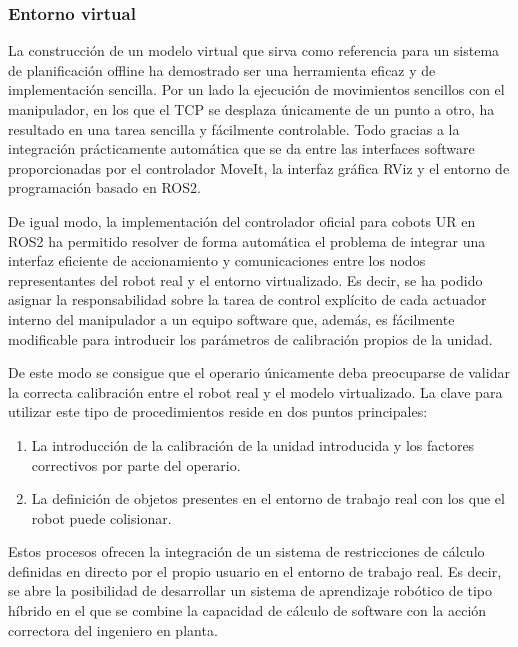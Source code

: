 \subsubsection*{Entorno virtual}
\hypertarget{Entorno virtual}{}

La construcción de un modelo virtual que sirva como referencia para un sistema de planificación offline ha demostrado ser una herramienta eficaz y de implementación sencilla. Por un lado la ejecución de movimientos sencillos con el manipulador, en los que el \acrshort{TCP} se desplaza únicamente de un punto a otro, ha resultado en una tarea sencilla y fácilmente controlable. Todo gracias a la integración prácticamente automática que se da entre las interfaces software proporcionadas por el controlador MoveIt, la interfaz gráfica RViz y el entorno de programación basado en ROS2. 

De igual modo, la implementación del controlador oficial para cobots UR en ROS2 ha permitido resolver de forma automática el problema de integrar una interfaz eficiente de accionamiento y comunicaciones entre los nodos representantes del robot real y el entorno virtualizado. Es decir, se ha podido asignar la responsabilidad sobre la tarea de control explícito de cada actuador interno del manipulador a un equipo software que, además, es fácilmente modificable para introducir los parámetros de calibración propios de la unidad. 

De este modo se consigue que el operario únicamente deba preocuparse de validar la correcta calibración entre el robot real y el modelo virtualizado. La clave para utilizar este tipo de procedimientos reside en dos puntos principales:
\begin{enumerate}
    \item La introducción de la calibración de la unidad introducida y los factores correctivos por parte del operario.
    \item La definición de objetos presentes en el entorno de trabajo real con los que el robot puede colisionar.
\end{enumerate}

Estos procesos ofrecen la integración de un sistema de restricciones de cálculo definidas en directo por el propio usuario en el entorno de trabajo real. Es decir, se abre la posibilidad de desarrollar un sistema de aprendizaje robótico de tipo híbrido en el que se combine la capacidad de cálculo de software con la acción correctora del ingeniero en planta.


